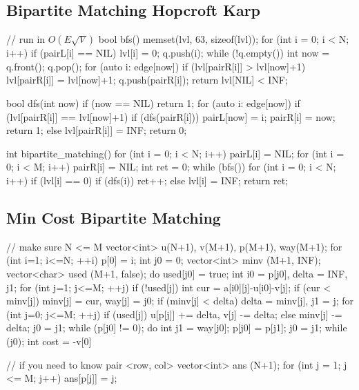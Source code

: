\subsection{Bipartite Matching Hopcroft Karp}
\begin{cppcode}
	// run in $O(E\sqrt{V})$
	bool bfs() {
		memset(lvl, 63, sizeof(lvl));
		for (int i = 0; i < N; i++) {
				if (pairL[i] == NIL) {
						lvl[i] = 0;
						q.push(i); }}
		while (!q.empty()) {
				int now = q.front(); q.pop();
				for (auto i: edge[now]) {
						if (lvl[pairR[i]] > lvl[now]+1) {
								lvl[pairR[i]] = lvl[now]+1;
								q.push(pairR[i]);
		}}}
		return lvl[NIL] < INF;
	}

	bool dfs(int now) {
		if (now == NIL) return 1;
		for (auto i: edge[now]) {
				if (lvl[pairR[i]] == lvl[now]+1) {
						if (dfs(pairR[i])) {
								pairL[now] = i;
								pairR[i] = now;
								return 1;
							} else lvl[pairR[i]] = INF;
		}}
		return 0;
	}

	int bipartite_matching() {
		for (int i = 0; i < N; i++) pairL[i] = NIL;
		for (int i = 0; i < M; i++) pairR[i] = NIL;
		int ret = 0;
		while (bfs()) {
				for (int i = 0; i < N; i++) {
						if (lvl[i] == 0) {
								if (dfs(i)) ret++;
								else lvl[i] = INF;
		}}}
		return ret;
	}
\end{cppcode}

\subsection{Min Cost Bipartite Matching}
\begin{cppcode}
	// make sure N <= M
	vector<int> u(N+1), v(M+1), p(M+1), way(M+1);
	for (int i=1; i<=N; ++i) {
		p[0] = i;
		int j0 = 0;
		vector<int> minv (M+1, INF);
		vector<char> used (M+1, false);
		do {
			used[j0] = true;
			int i0 = p[j0],  delta = INF,  j1;
			for (int j=1; j<=M; ++j) {
				if (!used[j]) {
					int cur = a[i0][j]-u[i0]-v[j];
					if (cur < minv[j]) minv[j] = cur,  way[j] = j0;
					if (minv[j] < delta) delta = minv[j],  j1 = j;
				}
			}
			for (int j=0; j<=M; ++j) {
				if (used[j]) u[p[j]] += delta,  v[j] -= delta;
				else minv[j] -= delta;
			}
			j0 = j1;
		} while (p[j0] != 0);
		do {
			int j1 = way[j0];
			p[j0] = p[j1];
			j0 = j1;
		} while (j0);
	}
	int cost = -v[0]

	// if you need to know pair <row, col>
	vector<int> ans (N+1);
	for (int j = 1; j <= M; j++) ans[p[j]] = j;
\end{cppcode}